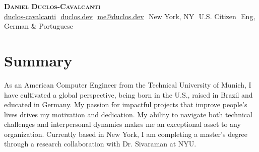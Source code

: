 \documentclass[letterpaper,11pt]{article}
\begin{document}
\begin{flushright}
\end{flushright}

\vspace{-5pt}

\begin{center}
    \textbf{\Huge \scshape Daniel Duclos-Cavalcanti} \\ \vspace{8pt}
    \small 
    \href{https://github.com/duclos-cavalcanti}{\underline{duclos-cavalcanti}} $  $
    \href{https://www.duclos.dev}{\underline{duclos.dev}} $  $
    \href{mailto:me@duclos.dev}{\underline{me@duclos.dev}} $ $
    New York, NY $ $
    U.S. Citizen $ $
    Eng, German \& Portuguese
\end{center}

\section{Summary}

\small{
As an American Computer Engineer from the Technical University of Munich, I 
have cultivated a global perspective, being born in the U.S., raised in Brazil and 
educated in Germany. My passion for impactful projects that improve people's lives drives my motivation and dedication. 
My ability to navigate both technical challenges and interpersonal dynamics makes me an exceptional asset 
to any organization. Currently based in New York, I am completing a master’s 
degree through a research collaboration with Dr. Sivaraman at NYU.}

\vspace{-8.0pt}

\end{document}
